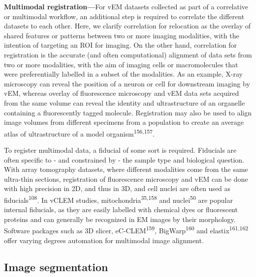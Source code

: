 \documentclass{article}
\begin{document}
\textbf{Multimodal registration—}For vEM datasets collected as part of a correlative or multimodal workflow, an additional step is required to correlate the different datasets to each other. Here, we clarify correlation for relocation as the overlay of shared features or patterns between two or more imaging modalities, with the intention of targeting an ROI for imaging. On the other hand, correlation for registration is the accurate (and often computational) alignment of data sets from two or more modalities, with the aim of imaging cells or macromolecules that were preferentially labelled in a subset of the modalities. As an example, X-ray microscopy can reveal the position of a neuron or cell for downstream imaging by vEM, whereas overlay of fluorescence microscopy and vEM data sets acquired from the same volume can reveal the identity and ultrastructure of an organelle containing a fluorescently tagged molecule. Registration may also be used to align image volumes from different specimens from a population to create an average atlas of ultrastructure of a model organism\textsuperscript{156,157}.

To register multimodal data, a fiducial of some sort is required. Fiducials are often specific to - and constrained by - the sample type and biological question. With array tomography datasets, where different modalities come from the same ultra-thin sections, registration of fluorescence microscopy and vEM can be done with high precision in 2D, and thus in 3D, and cell nuclei are often used as fiducials\textsuperscript{108}. In vCLEM studies, mitochondria\textsuperscript{35,158} and nuclei\textsuperscript{50} are popular internal fiducials, as they are easily labelled with chemical dyes or fluorescent proteins and can generally be recognized in EM images by their morphology. Software packages such as 3D slicer, eC-CLEM\textsuperscript{159}, BigWarp\textsuperscript{160} and elastix\textsuperscript{161,162} offer varying degrees automation for multimodal image alignment.

\subsection*{Image segmentation}
\end{document}
